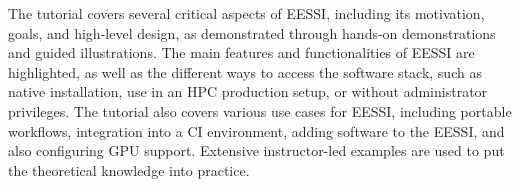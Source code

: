 

The tutorial covers several critical aspects of EESSI, including its motivation, goals, and high-level design, as
demonstrated through hands-on demonstrations and guided illustrations. The main features and functionalities of EESSI
are highlighted, as well as the different ways to access the software stack, such as native installation, use in an HPC
production setup, or without administrator privileges. The tutorial also covers various use cases for EESSI, including
portable workflows, integration into a CI environment, adding software to the EESSI, and also configuring GPU support.
Extensive instructor-led examples are used to put the theoretical knowledge into practice.

